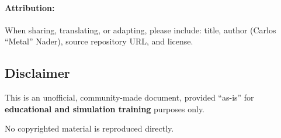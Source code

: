 \documentclass[11pt, a4paper, twoside]{report}
\begin{document}
\paragraph{Attribution:}
When sharing, translating, or adapting, please include: title, author (Carlos ``Metal'' Nader), source repository URL, and license.

\subsection{Disclaimer}
\label{sec:C1-S4-S4}

This is an unofficial, community-made document, provided ``as-is'' for \textbf{educational and simulation training} purposes only.

No copyrighted material is reproduced directly.

\end{document}
